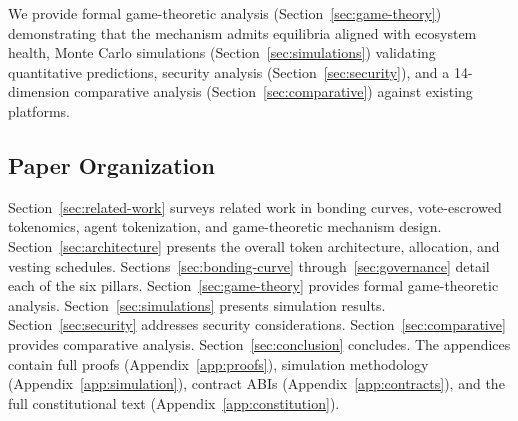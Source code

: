 We provide formal game-theoretic analysis (Section~\ref{sec:game-theory})
demonstrating that the mechanism admits equilibria aligned with ecosystem
health, Monte Carlo simulations (Section~\ref{sec:simulations}) validating
quantitative predictions, security analysis (Section~\ref{sec:security}), and a
14-dimension comparative analysis (Section~\ref{sec:comparative}) against
existing platforms.

\subsection{Paper Organization}
\label{subsec:organization}

Section~\ref{sec:related-work} surveys related work in bonding curves,
vote-escrowed tokenomics, agent tokenization, and game-theoretic mechanism
design. Section~\ref{sec:architecture} presents the overall token architecture,
allocation, and vesting schedules. Sections~\ref{sec:bonding-curve}
through~\ref{sec:governance} detail each of the six pillars. Section~\ref{sec:game-theory}
provides formal game-theoretic analysis. Section~\ref{sec:simulations} presents
simulation results. Section~\ref{sec:security} addresses security
considerations. Section~\ref{sec:comparative} provides comparative analysis.
Section~\ref{sec:conclusion} concludes. The appendices contain full proofs
(Appendix~\ref{app:proofs}), simulation methodology
(Appendix~\ref{app:simulation}), contract ABIs
(Appendix~\ref{app:contracts}), and the full constitutional text
(Appendix~\ref{app:constitution}).
